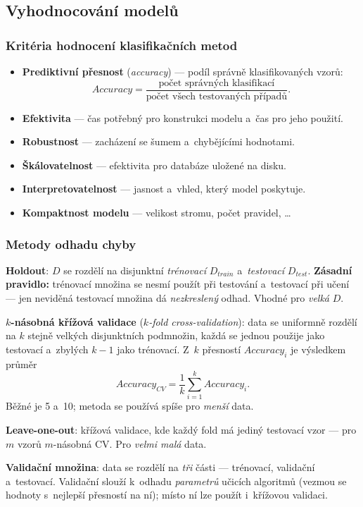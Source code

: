 \documentclass[11pt,a4paper]{article}
\theoremstyle{definition}
\begin{document}
\subsection{Vyhodnocování modelů}
\label{ssec:eval}

\subsubsection{Kritéria hodnocení klasifikačních metod}

\begin{itemize}
\item \textbf{Prediktivní přesnost} (\emph{accuracy}) --- podíl správně klasifikovaných vzorů:
      \[ \mathit{Accuracy}=\frac{\text{počet správných klasifikací}}
         {\text{počet všech testovaných případů}}. \]
\item \textbf{Efektivita} --- čas potřebný pro konstrukci modelu a~čas pro jeho použití.
\item \textbf{Robustnost} --- zacházení se šumem a~chybějícími hodnotami.
\item \textbf{Škálovatelnost} --- efektivita pro databáze uložené na disku.
\item \textbf{Interpretovatelnost} --- jasnost a~vhled, který model poskytuje.
\item \textbf{Kompaktnost modelu} --- velikost stromu, počet pravidel, \dots
\end{itemize}

\subsubsection{Metody odhadu chyby}

\begin{defbox}
\textbf{Holdout}: $D$ se rozdělí na disjunktní \emph{trénovací} $D_{train}$ a~\emph{testovací}
$D_{test}$. \textbf{Zásadní pravidlo:} trénovací množina se nesmí použít při testování
a~testovací při učení --- jen neviděná testovací množina dá \emph{nezkreslený} odhad. Vhodné pro
\emph{velká} $D$.

\textbf{$k$-násobná křížová validace} (\emph{$k$-fold cross-validation}): data se uniformně
rozdělí na $k$ stejně velkých disjunktních podmnožin, každá se jednou použije jako testovací
a~zbylých $k-1$ jako trénovací. Z~$k$ přesností $\mathit{Accuracy}_i$ je výsledkem průměr
\[ \mathit{Accuracy}_{CV}=\frac1k\sum_{i=1}^{k}\mathit{Accuracy}_i. \]
Běžné je 5 a~10; metoda se používá spíše pro \emph{menší} data.

\textbf{Leave-one-out}: křížová validace, kde každý fold má jediný testovací vzor --- pro $m$
vzorů $m$-násobná CV. Pro \emph{velmi malá} data.

\textbf{Validační množina}: data se rozdělí na \emph{tři} části --- trénovací, validační
a~testovací. Validační slouží k~odhadu \emph{parametrů} učicích algoritmů (vezmou se hodnoty
s~nejlepší přesností na ní); místo ní lze použít i~křížovou validaci.
\end{defbox}
\end{document}
